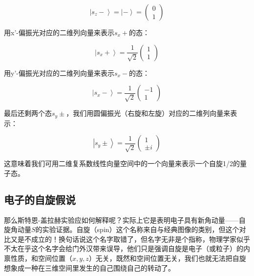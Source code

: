 \begin{equation}
\left| s_z - \right\rangle = \left| - \right\rangle = \left( \begin{array}{cc} 0 \\ 1 \end{array} \right)
\end{equation}

用x'-偏振光对应的二维列向量来表示$s_x +$的态：

\begin{equation}
\left| s_x + \right\rangle  = \frac{1}{\sqrt 2} \left( \begin{array}{cc} 1 \\ 1 \end{array} \right)
\end{equation}

用y'-偏振光对应的二维列向量来表示$s_x -$的态：

\begin{equation}
\left| s_x - \right\rangle  = \frac{1}{\sqrt 2} \left( \begin{array}{cc} -1 \\ 1 \end{array} \right)
\end{equation}

最后还剩两个态$s_y \pm$，我们用圆偏振光（右旋和左旋）对应的二维列向量来表示：

\begin{equation}
\left| s_y \pm \right\rangle = \frac{1}{\sqrt 2} \left( \begin{array}{cc} 1 \\ \pm i \end{array} \right)
\end{equation}

这意味着我们可用二维复系数线性向量空间中的一个向量来表示一个自旋1/2的量子态。

\subsection{电子的自旋假说}

那么斯特恩-盖拉赫实验应如何解释呢？实际上它是表明电子具有新角动量——自旋角动量$S$的实验证据。自旋（spin）这个名称来自与经典图像的类别，但这个对比又是不成立的！换句话说这个名字取错了，但名字无非是个指称，物理学家似乎不太在乎这个名字会给门外汉带来误导，他们只是强调自旋是电子（或粒子）的内禀性质，和空间位置（$x, y, z$）无关，既然和空间位置无关，我们也就无法把自旋想象成一种在三维空间里发生的自己围绕自己的转动了。

